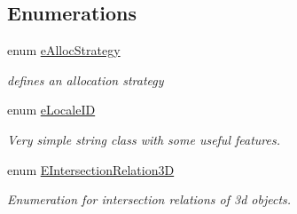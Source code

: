 \subsection*{Enumerations}
\begin{DoxyCompactItemize}
\item 
\mbox{\label{namespaceirr_1_1core_aa2e91971d5e6e84de235bfabe3c7adba}} 
enum \hyperlink{namespaceirr_1_1core_aa2e91971d5e6e84de235bfabe3c7adba}{e\+Alloc\+Strategy} \begin{DoxyCompactList}\small\item\em defines an allocation strategy \end{DoxyCompactList}
\item 
enum \hyperlink{namespaceirr_1_1core_a4682709540c80568b555acc36dbf3a4a}{e\+Locale\+ID} \begin{DoxyCompactList}\small\item\em Very simple string class with some useful features. \end{DoxyCompactList}
\item 
\mbox{\label{namespaceirr_1_1core_a8a9999eb0d151083f48afe5f7d17a96c}} 
enum \hyperlink{namespaceirr_1_1core_a8a9999eb0d151083f48afe5f7d17a96c}{E\+Intersection\+Relation3D} \begin{DoxyCompactList}\small\item\em Enumeration for intersection relations of 3d objects. \end{DoxyCompactList}
\end{DoxyCompactItemize}

